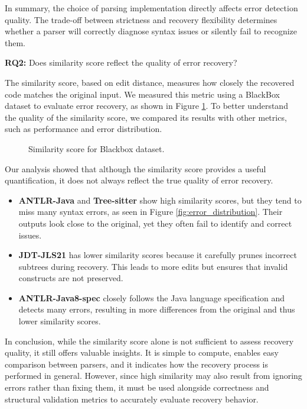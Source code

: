 \documentclass[conference]{IEEEtran}
\begin{document}
In summary, the choice of parsing implementation directly affects error detection quality. The trade-off between strictness and recovery flexibility determines whether a parser will correctly diagnose syntax issues or silently fail to recognize them. 

\textbf{RQ2:} Does similarity score reflect the quality of error recovery?  

The similarity score, based on edit distance, measures how closely the recovered code matches the original input. We measured this metric using a BlackBox dataset to evaluate error recovery, as shown in Figure \ref{fig:sim}. To better understand the quality of the similarity score, we compared its results with other metrics, such as performance and error distribution. 

\begin{figure}[htbp]


\caption{Similarity score for Blackbox dataset.}
\label{fig:sim}
\end{figure}

Our analysis showed that although the similarity score provides a useful quantification, it does not always reflect the true quality of error recovery.
\begin{itemize}
    \item \textbf{ANTLR-Java} and \textbf{Tree-sitter} show high similarity scores, but they tend to miss many syntax errors, as seen in Figure \ref{fig:error_distribution}. Their outputs look close to the original, yet they often fail to identify and correct issues.
    
    \item \textbf{JDT-JLS21} has lower similarity scores because it carefully prunes incorrect subtrees during recovery. This leads to more edits but ensures that invalid constructs are not preserved.
    
    \item \textbf{ANTLR-Java8-spec} closely follows the Java language specification and detects many errors, resulting in more differences from the original and thus lower similarity scores.
\end{itemize}

In conclusion, while the similarity score alone is not sufficient to assess recovery quality, it still offers valuable insights. It is simple to compute, enables easy comparison between parsers, and it indicates how the recovery process is performed in general. However, since high similarity may also result from ignoring errors rather than fixing them, it must be used alongside correctness and structural validation metrics to accurately evaluate recovery behavior.
\end{document}
